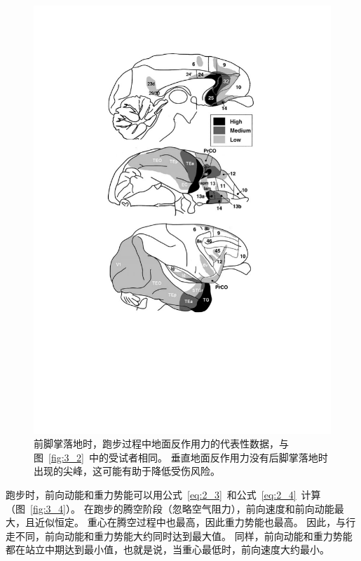 \begin{figure}[!htb]
	\centering
	\includegraphics[width=1.0\linewidth]{chap3/3_3}
	\caption{前脚掌落地时，跑步过程中地面反作用力的代表性数据，与图~\ref{fig:3_2}~中的受试者相同。
		垂直地面反作用力没有后脚掌落地时出现的尖峰，这可能有助于降低受伤风险\cite{yong2020foot}。 \label{fig:3_3}}
\end{figure}


跑步时，前向动能和重力势能可以用公式~\ref{eq:2_3}~和公式~\ref{eq:2_4}~计算（图~\ref{fig:3_4}）。
在跑步的腾空阶段（忽略空气阻力），前向速度和前向动能最大，且近似恒定。
重心在腾空过程中也最高，因此重力势能也最高。
因此，与行走不同，前向动能和重力势能大约同时达到最大值。
同样，前向动能和重力势能都在站立中期达到最小值，也就是说，当重心最低时，前向速度大约最小。

